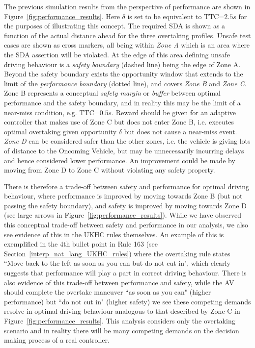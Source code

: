 The previous simulation results from the perspective of performance are shown in Figure~\ref{fig:performance_results}. 
%
Here $\delta$ is set to be equivalent to TTC=$2.5s$ \cite{Robbins2018, Chen2015} for the purposes of illustrating this concept. 
%
The required SDA is shown as a function of the actual distance ahead for the three overtaking profiles. Unsafe test cases are shown as cross markers, all being within \emph{Zone A} which is an area where the SDA assertion will be violated. 
%
At the edge of this area defining unsafe driving behaviour is a \emph{safety boundary} (dashed line) being the edge of Zone A. 
%
Beyond the safety boundary exists the opportunity window that extends to the limit of the \emph{performance boundary} (dotted line), and covers \emph{Zone B} and \emph{Zone C}. 
%
Zone B represents a conceptual \emph{safety margin} or \emph{buffer} between optimal performance and the safety boundary, and in reality this may be the limit of a near-miss condition, e.g. TTC=$0.5s$. 
%
Reward should be given for an adaptive controller that makes use of Zone C but does not enter Zone B, i.e. executes optimal overtaking given opportunity $\delta$ but does not cause a near-miss event. 
%
\emph{Zone D} can be considered safer than the other zones, i.e. the vehicle is giving lots of distance to the Oncoming Vehicle, but may be unnecessarily incurring delays and hence considered lower performance. An improvement could be made by moving from Zone D to Zone C without violating any safety property. 

There is therefore a trade-off between safety and performance for optimal driving behaviour, where performance is improved by moving towards Zone B (but not passing the safety boundary), and safety is improved by moving towards Zone D (see large arrows in Figure~\ref{fig:performance_results}). 
%
While we have observed this conceptual trade-off between safety and performance in our analysis, we also see evidence of this in the UKHC rules themselves. An example of this is exemplified in the 4th bullet point in Rule 163 (see Section~\ref{interp_nat_lang_UKHC_rules}) where the overtaking rule states ``Move back to the left as soon as you can but do not cut in", which clearly suggests that performance will play a part in correct driving behaviour. There is also evidence of this trade-off between performance and safety, while the AV should complete the overtake maneuver ``as soon as you can" (higher performance) but ``do not cut in" (higher safety) we see these competing demands resolve in optimal driving behaviour analogous to that described by Zone C in Figure~\ref{fig:performance_results}. 
%
This analysis considers only the overtaking scenario and in reality there will be many competing demands on the decision making process of a real controller. 

